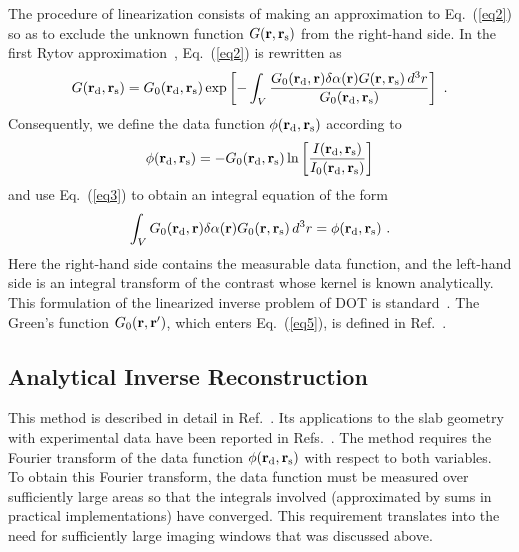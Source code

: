 The procedure of linearization consists of making an approximation to
Eq.~(\ref{eq2}) so as to exclude the unknown function $G({\bf r}, {\bf
  r}_{\rm s})$ from the right-hand side. In the first Rytov
approximation~\cite{schotland_97_1}, Eq.~(\ref{eq2}) is rewritten as
%
\begin{equation}
G({\bf r}_{\rm d}, {\bf r}_{\rm s}) = G_0({\bf r}_{\rm d}, {\bf r}_{\rm s})
\exp\left[ -\int_V \frac{G_0({\bf r}_{\rm d}, {\bf r}) \delta\alpha({\bf r})
G({\bf r}, {\bf r}_{\rm s}) \,d^3r}{G_0({\bf r}_{\rm d}, {\bf r}_{\rm s})}
\right] \ .
\label{eq3}
\end{equation}
%
\noindent
Consequently, we define the data function $\phi({\bf r}_{\rm d}, {\bf
  r}_{\rm s})$ according to
%
\begin{equation}
\phi({\bf r}_{\rm d},{\bf r}_{\rm s})=
-G_0({\bf r}_{\rm d},{\bf r}_{\rm s})
\ln\left[\frac{I({\bf r}_{\rm d},{\bf r}_{\rm s})}
{I_0({\bf r}_{\rm d},{\bf r}_{\rm s})}\right]
\label{eq4}
\end{equation}
%
\noindent
and use Eq.~(\ref{eq3}) to obtain an integral equation of the form
%
\begin{equation}
\int_VG_0({\bf r}_{\rm d}, {\bf r})\delta\alpha({\bf r}) G_0({\bf r},
{\bf r}_{\rm s})\,d^3r = \phi({\bf r}_{\rm d}, {\bf r}_{\rm s}) \ .
\label{eq5}
\end{equation}
%
\noindent
Here the right-hand side contains the measurable data function, and the
left-hand side is an integral transform of the contrast whose kernel
is known analytically. This formulation of the linearized inverse
problem of DOT is standard~\cite{schotland_97_1}. The Green's function
$G_0({\bf r},{\bf r}^{\prime})$, which enters Eq.~(\ref{eq5}), is
defined in Ref.~\cite{markel_04_4}.



\subsection{Analytical Inverse Reconstruction}
\label{sec:Analytic}
This method is described in detail in Ref.~\cite{markel_04_4}.  
Its applications to the slab geometry with experimental data have been
reported in Refs.~\cite{wang_05_1,konecky_08_1}. The method requires
the Fourier transform of the data function $\phi({\bf r}_{\rm d}, {\bf
  r}_{\rm s})$ with respect to both variables. To obtain this Fourier
transform, the data function must be measured over sufficiently large
areas so that the integrals involved (approximated by sums in 
practical implementations) have converged. This requirement translates
into the need for sufficiently large imaging windows that was discussed above.

